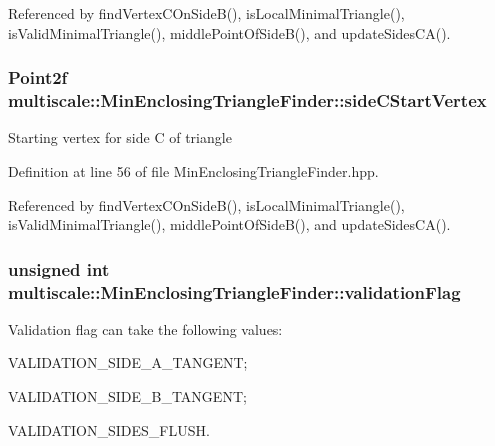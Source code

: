 Referenced by find\-Vertex\-C\-On\-Side\-B(), is\-Local\-Minimal\-Triangle(), is\-Valid\-Minimal\-Triangle(), middle\-Point\-Of\-Side\-B(), and update\-Sides\-C\-A().

\hypertarget{classmultiscale_1_1MinEnclosingTriangleFinder_a877d0c34c4803643699d8fd176c24d4e}{
\subsubsection[{side\-C\-Start\-Vertex}]{\setlength{\rightskip}{0pt plus 5cm}Point2f multiscale\-::\-Min\-Enclosing\-Triangle\-Finder\-::side\-C\-Start\-Vertex\hspace{0.3cm}{\ttfamily [private]}}}\label{classmultiscale_1_1MinEnclosingTriangleFinder_a877d0c34c4803643699d8fd176c24d4e}
Starting vertex for side C of triangle 

Definition at line 56 of file Min\-Enclosing\-Triangle\-Finder.\-hpp.



Referenced by find\-Vertex\-C\-On\-Side\-B(), is\-Local\-Minimal\-Triangle(), is\-Valid\-Minimal\-Triangle(), middle\-Point\-Of\-Side\-B(), and update\-Sides\-C\-A().

\hypertarget{classmultiscale_1_1MinEnclosingTriangleFinder_a19f9149638eddeec22b775eef632c6ef}{
\subsubsection[{validation\-Flag}]{\setlength{\rightskip}{0pt plus 5cm}unsigned int multiscale\-::\-Min\-Enclosing\-Triangle\-Finder\-::validation\-Flag\hspace{0.3cm}{\ttfamily [private]}}}\label{classmultiscale_1_1MinEnclosingTriangleFinder_a19f9149638eddeec22b775eef632c6ef}
Validation flag can take the following values\-:
\begin{DoxyItemize}
\item V\-A\-L\-I\-D\-A\-T\-I\-O\-N\-\_\-\-S\-I\-D\-E\-\_\-\-A\-\_\-\-T\-A\-N\-G\-E\-N\-T;
\item V\-A\-L\-I\-D\-A\-T\-I\-O\-N\-\_\-\-S\-I\-D\-E\-\_\-\-B\-\_\-\-T\-A\-N\-G\-E\-N\-T;
\item V\-A\-L\-I\-D\-A\-T\-I\-O\-N\-\_\-\-S\-I\-D\-E\-S\-\_\-\-F\-L\-U\-S\-H. 
\end{DoxyItemize}


